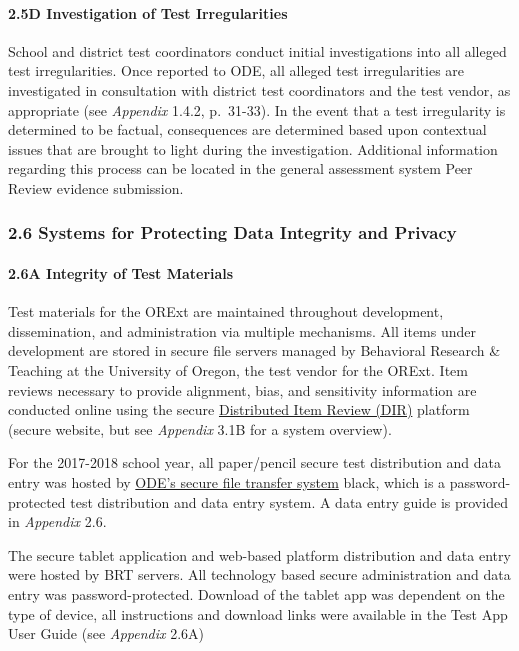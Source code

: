 \documentclass[]{article}
\let\oldparagraph\paragraph
\renewcommand{\paragraph}[1]{\oldparagraph{#1}\mbox{}}
\begin{document}
\paragraph{2.5D Investigation of Test
Irregularities}\label{d-investigation-of-test-irregularities}

School and district test coordinators conduct initial investigations
into all alleged test irregularities. Once reported to ODE, all alleged
test irregularities are investigated in consultation with district test
coordinators and the test vendor, as appropriate (see \emph{Appendix}
1.4.2, p.~31-33). In the event that a test irregularity is determined to
be factual, consequences are determined based upon contextual issues
that are brought to light during the investigation. Additional
information regarding this process can be located in the general
assessment system Peer Review evidence submission.

\subsubsection{2.6 Systems for Protecting Data Integrity and
Privacy}\label{systems-for-protecting-data-integrity-and-privacy}

\paragraph{2.6A Integrity of Test
Materials}\label{a-integrity-of-test-materials}

Test materials for the ORExt are maintained throughout development,
dissemination, and administration via multiple mechanisms. All items
under development are stored in secure file servers managed by
Behavioral Research \& Teaching at the University of Oregon, the test
vendor for the ORExt. Item reviews necessary to provide alignment, bias,
and sensitivity information are conducted online using the secure
\color{link}\href{http://brtitemreview.com}{Distributed Item Review
(DIR)} \color{black} platform (secure website, but see \emph{Appendix}
3.1B for a system overview).

For the 2017-2018 school year, all paper/pencil secure test distribution
and data entry was hosted by
\color{link}\href{https://district.ode.state.or.us/apps/login/}{ODE's
secure file transfer system} \color
{black}, which is a password-protected test distribution and data entry
system. A data entry guide is provided in \emph{Appendix} 2.6.

The secure tablet application and web-based platform distribution and
data entry were hosted by BRT servers. All technology based secure
administration and data entry was password-protected. Download of the
tablet app was dependent on the type of device, all instructions and
download links were available in the Test App User Guide (see
\emph{Appendix} 2.6A)
\end{document}
